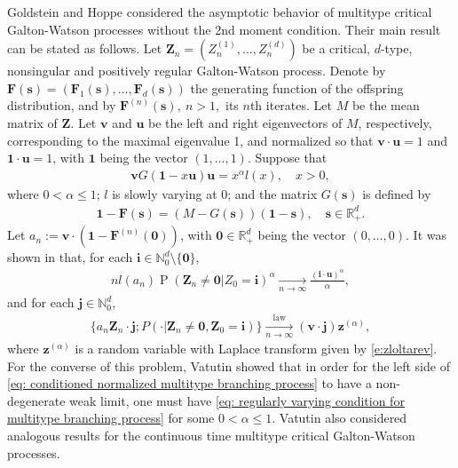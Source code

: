 \documentclass[UTF8]{pkuthss}
\theoremstyle{plain}
\theoremstyle{definition}
\numberwithin{equation}{section}
\begin{document}
	Goldstein and Hoppe \cite{GoldsteinHoppe1978Critical} considered the asymptotic behavior of multitype critical Galton-Watson processes without the 2nd moment
    condition. Their main result can be stated as follows.
	Let $\mathbf Z_n=(Z_n^{(1)}, \dots, Z_n^{(d)})$ be a critical, $d$-type, nonsingular and positively regular Galton-Watson process.
	Denote by $\mathbf F(\mathbf s) = (\mathbf F_1(\mathbf s), \dots, \mathbf F_d(\mathbf s))$ the generating function of the offspring distribution, and by $\mathbf F^{(n)}(\mathbf s), ~ n>1,$ its $n$th iterates.
	Let $M$ be the mean matrix of $\mathbf Z$. Let $\mathbf v$ and $\mathbf u$ be the left and right  eigenvectors of $M$, 
	respectively, corresponding to the maximal eigenvalue 1, and normalized so that $\mathbf v \cdot \mathbf u = 1$ and $\mathbf 1 \cdot \mathbf u = 1$, with $\mathbf 1$ being the vector $(1,\dots, 1)$.
	Suppose that
\begin{align}\label{eq: regularly varying condition for multitype branching process}
	\mathbf v G(\mathbf 1-x\mathbf u) \mathbf u
	= x^\alpha l(x),
	\quad x > 0,
\end{align}
	where $0 < \alpha \leq 1$; 
	$l$ is slowly varying at $0$;
	and the matrix $G(\mathbf s)$ is defined by
\begin{align}
	\mathbf 1 - \mathbf F(\mathbf s)
	= (M - G(\mathbf s))(\mathbf 1 - \mathbf s),
	\quad \mathbf s \in \mathbb R_+^d.
\end{align}
    Let $a_n := \mathbf v \cdot (\mathbf 1 - \mathbf F^{(n)}(\mathbf 0))$, with $\mathbf 0 \in \mathbb R_+^d$ being the vector $(0,\dots, 0)$.
	It was shown in \cite{GoldsteinHoppe1978Critical} that, for each $\mathbf i \in \mathbb N_0^d \setminus \{\mathbf 0\}$,
\begin{align} \label{eq: limit behavior of the exitinction probability without finite variance of multitype branching processes}
    n l(a_n)
	\operatorname{P}(\mathbf Z_n \neq \mathbf 0| Z_0 = \mathbf i)^\alpha
	\xrightarrow[n\to \infty]{}
	\frac{(\mathbf i \cdot \mathbf u)^\alpha}\alpha,
\end{align}
	and for each $\mathbf j \in \mathbb N_0^d$,
\begin{align}\label{eq: conditioned normalized multitype branching process}
	\{ a_n \mathbf Z_n \cdot \mathbf j ; P(\cdot | \mathbf Z_n \neq \mathbf 0, \mathbf Z_0 = \mathbf i)\}
	\xrightarrow[n\to \infty]{\operatorname{law}} (\mathbf v\cdot \mathbf j) \mathbf z^{(\alpha)},
\end{align}
	where $\mathbf z^{(\alpha)}$ is a random variable with Laplace transform given by \eqref{e:zloltarev}.
	For the converse of this problem, Vatutin \cite{Vatutin1977Limit} showed that in order for the left side of \eqref{eq: conditioned normalized multitype branching process} to have a non-degenerate weak limit, one must have \eqref{eq: regularly varying condition for multitype branching process} for some $0 < \alpha \leq 1$.
	Vatutin \cite{Vatutin1977Limit} also considered analogous results for the continuous time multitype critical Galton-Watson processes.
	
\end{document}
